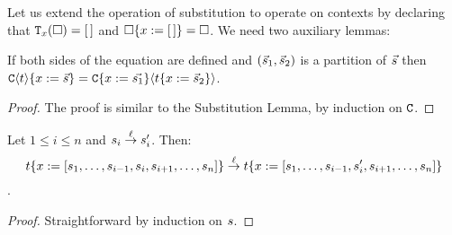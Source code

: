 
Let us extend the operation of substitution to operate on contexts
by declaring that $\mathtt{T}_{x}(\Box) = [\,]$
and $\Box\{x := [\,]\} = \Box$.
We need two auxiliary lemmas:

\begin{lemma}
If both sides of the equation are defined
and $(\vec{s}_1,\vec{s}_2)$ is a partition of $\vec{s}$
then
$\mathtt{C}\langle t\rangle\{x := \vec{s}\} = \mathtt{C}\{x := \vec{s_1}\}\langle t\{x := \vec{s}_2\}\rangle$.
\end{lemma}
\begin{proof}
The proof is similar to the Substitution Lemma, by induction on $\mathtt{C}$.
\end{proof}

\begin{lemma}
Let $1 \leq i \leq n$ and $s_i \overset{\ell}{\to} s'_i$.
Then:
\[
 t\{x := [s_1,\hdots,s_{i-1},s_i,s_{i+1},\hdots,s_n]\} \overset{\ell}{\to}
 t\{x := [s_1,\hdots,s_{i-1},s'_i,s_{i+1},\hdots,s_n]\}
\].
\end{lemma}
\begin{proof}
Straightforward by induction on $s$.
\end{proof}

